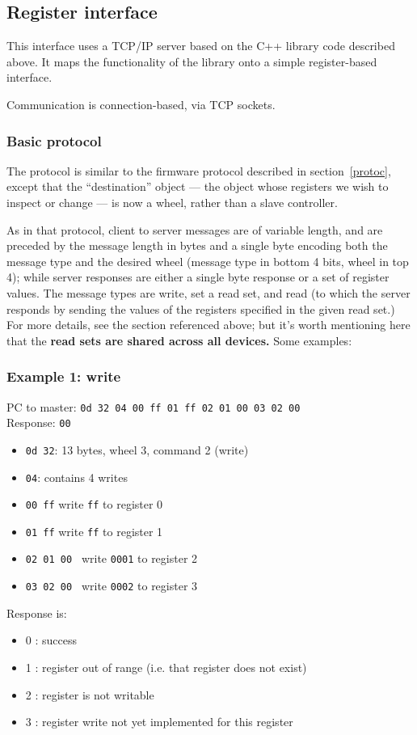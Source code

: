 
\subsection{Register interface}
This interface uses a TCP/IP server based on the C++ library code described above. It maps
the functionality of the library onto a simple register-based interface.

Communication is connection-based, via TCP sockets.

\subsubsection{Basic protocol}
The protocol is similar to the firmware protocol described in
section~\ref{protoc}, except that the ``destination'' object --- the object
whose registers we wish to inspect or change --- is now a wheel, rather than a slave controller.

As in that protocol, client to server messages are of variable length, and are
preceded by the message length in bytes and a single byte encoding both the message
type and the desired wheel (message type in bottom 4 bits, wheel in top 4); while server
responses are either a single byte response or a set of 
register values. The message types are write, set a read set, and read (to which
the server responds by sending the values of the registers specified in the given read set.) For more
details, see the section referenced above; but it's worth mentioning here that the
\textbf{read sets are shared across all devices.}
Some examples:
\subsubsection{Example 1: write}
PC to master: \verb+0d 32 04 00 ff 01 ff 02 01 00 03 02 00+ \\
Response: \verb+00+ 
\begin{itemize}
\item \verb+0d 32+:  13 bytes, wheel 3, command 2 (write)
\item \verb+04+: contains 4 writes
\item \verb+00 ff+ write \verb+ff+ to register 0
\item \verb+01 ff+ write \verb+ff+ to register 1
\item \verb+02 01 00 + write \verb+0001+ to register 2
\item \verb+03 02 00 + write \verb+0002+ to register 3
\end{itemize}
Response is:
\begin{itemize}
\item 0 : success
\item 1 : register out of range (i.e. that register does not exist)
\item 2 : register is not writable
\item 3 : register write not yet implemented for this register
\end{itemize}



